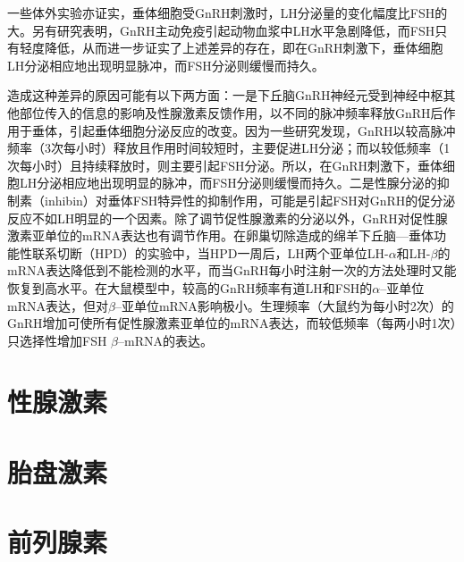 一些体外实验亦证实，垂体细胞受GnRH刺激时，LH分泌量的变化幅度比FSH的大。另有研究表明，GnRH主动免疫引起动物血浆中LH水平急剧降低，而FSH只有轻度降低，从而进一步证实了上述差异的存在，即在GnRH刺激下，垂体细胞LH分泌相应地出现明显脉冲，而FSH分泌则缓慢而持久。

造成这种差异的原因可能有以下两方面：一是下丘脑GnRH神经元受到神经中枢其他部位传入的信息的影响及性腺激素反馈作用，以不同的脉冲频率释放GnRH后作用于垂体，引起垂体细胞分泌反应的改变。因为一些研究发现，GnRH以较高脉冲频率（3次每小时）释放且作用时间较短时，主要促进LH分泌；而以较低频率（1次每小时）且持续释放时，则主要引起FSH分泌。所以，在GnRH刺激下，垂体细胞LH分泌相应地出现明显的脉冲，而FSH分泌则缓慢而持久。二是性腺分泌的抑制素（inhibin）对垂体FSH特异性的抑制作用，可能是引起FSH对GnRH的促分泌反应不如LH明显的一个因素。除了调节促性腺激素的分泌以外，GnRH对促性腺激素亚单位的mRNA表达也有调节作用。在卵巢切除造成的绵羊下丘脑---垂体功能性联系切断（HPD）的实验中，当HPD一周后，LH两个亚单位LH-$ \alpha $和LH-$ \beta $的mRNA表达降低到不能检测的水平，而当GnRH每小时注射一次的方法处理时又能恢复到高水平。在大鼠模型中，较高的GnRH频率有道LH和FSH的$ \alpha $--亚单位mRNA表达，但对$ \beta $--亚单位mRNA影响极小。生理频率（大鼠约为每小时2次）的GnRH增加可使所有促性腺激素亚单位的mRNA表达，而较低频率（每两小时1次）只选择性增加FSH $ \beta $--mRNA的表达。






\section{性腺激素}

\section{胎盘激素}

\section{前列腺素}